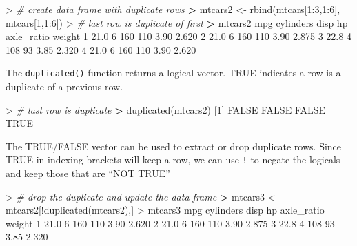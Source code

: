 \documentclass[
]{book}
\newenvironment{Shaded}{\begin{snugshade}}{\end{snugshade}}
\newcommand{\CommentTok}[1]{\textcolor[rgb]{0.56,0.35,0.01}{\textit{#1}}}
\newcommand{\ConstantTok}[1]{\textcolor[rgb]{0.00,0.00,0.00}{#1}}
\newcommand{\DecValTok}[1]{\textcolor[rgb]{0.00,0.00,0.81}{#1}}
\newcommand{\ErrorTok}[1]{\textcolor[rgb]{0.64,0.00,0.00}{\textbf{#1}}}
\newcommand{\FloatTok}[1]{\textcolor[rgb]{0.00,0.00,0.81}{#1}}
\newcommand{\FunctionTok}[1]{\textcolor[rgb]{0.00,0.00,0.00}{#1}}
\newcommand{\NormalTok}[1]{#1}
\newcommand{\OtherTok}[1]{\textcolor[rgb]{0.56,0.35,0.01}{#1}}
\newcommand{\SpecialCharTok}[1]{\textcolor[rgb]{0.00,0.00,0.00}{#1}}
\begin{document}
\begin{Shaded}
\begin{Highlighting}[]
\SpecialCharTok{\textgreater{}} \CommentTok{\# create data frame with duplicate rows}
\ErrorTok{\textgreater{}}\NormalTok{ mtcars2 }\OtherTok{\textless{}{-}} \FunctionTok{rbind}\NormalTok{(mtcars[}\DecValTok{1}\SpecialCharTok{:}\DecValTok{3}\NormalTok{,}\DecValTok{1}\SpecialCharTok{:}\DecValTok{6}\NormalTok{], mtcars[}\DecValTok{1}\NormalTok{,}\DecValTok{1}\SpecialCharTok{:}\DecValTok{6}\NormalTok{])}
\SpecialCharTok{\textgreater{}} \CommentTok{\# last row is duplicate of first}
\ErrorTok{\textgreater{}}\NormalTok{ mtcars2}
\NormalTok{   mpg cylinders disp  hp axle\_ratio weight}
\DecValTok{1} \FloatTok{21.0}         \DecValTok{6}  \DecValTok{160} \DecValTok{110}       \FloatTok{3.90}  \FloatTok{2.620}
\DecValTok{2} \FloatTok{21.0}         \DecValTok{6}  \DecValTok{160} \DecValTok{110}       \FloatTok{3.90}  \FloatTok{2.875}
\DecValTok{3} \FloatTok{22.8}         \DecValTok{4}  \DecValTok{108}  \DecValTok{93}       \FloatTok{3.85}  \FloatTok{2.320}
\DecValTok{4} \FloatTok{21.0}         \DecValTok{6}  \DecValTok{160} \DecValTok{110}       \FloatTok{3.90}  \FloatTok{2.620}
\end{Highlighting}
\end{Shaded}

The \texttt{duplicated()} function returns a logical vector. TRUE indicates a row is a duplicate of a previous row.

\begin{Shaded}
\begin{Highlighting}[]
\SpecialCharTok{\textgreater{}} \CommentTok{\# last row is duplicate}
\ErrorTok{\textgreater{}} \FunctionTok{duplicated}\NormalTok{(mtcars2)}
\NormalTok{[}\DecValTok{1}\NormalTok{] }\ConstantTok{FALSE} \ConstantTok{FALSE} \ConstantTok{FALSE}  \ConstantTok{TRUE}
\end{Highlighting}
\end{Shaded}

The TRUE/FALSE vector can be used to extract or drop duplicate rows. Since TRUE in indexing brackets will keep a row, we can use \texttt{!} to negate the logicals and keep those that are ``NOT TRUE''

\begin{Shaded}
\begin{Highlighting}[]
\SpecialCharTok{\textgreater{}} \CommentTok{\# drop the duplicate and update the data frame}
\ErrorTok{\textgreater{}}\NormalTok{ mtcars3 }\OtherTok{\textless{}{-}}\NormalTok{ mtcars2[}\SpecialCharTok{!}\FunctionTok{duplicated}\NormalTok{(mtcars2),]}
\SpecialCharTok{\textgreater{}}\NormalTok{ mtcars3}
\NormalTok{   mpg cylinders disp  hp axle\_ratio weight}
\DecValTok{1} \FloatTok{21.0}         \DecValTok{6}  \DecValTok{160} \DecValTok{110}       \FloatTok{3.90}  \FloatTok{2.620}
\DecValTok{2} \FloatTok{21.0}         \DecValTok{6}  \DecValTok{160} \DecValTok{110}       \FloatTok{3.90}  \FloatTok{2.875}
\DecValTok{3} \FloatTok{22.8}         \DecValTok{4}  \DecValTok{108}  \DecValTok{93}       \FloatTok{3.85}  \FloatTok{2.320}
\end{Highlighting}
\end{Shaded}
\end{document}
